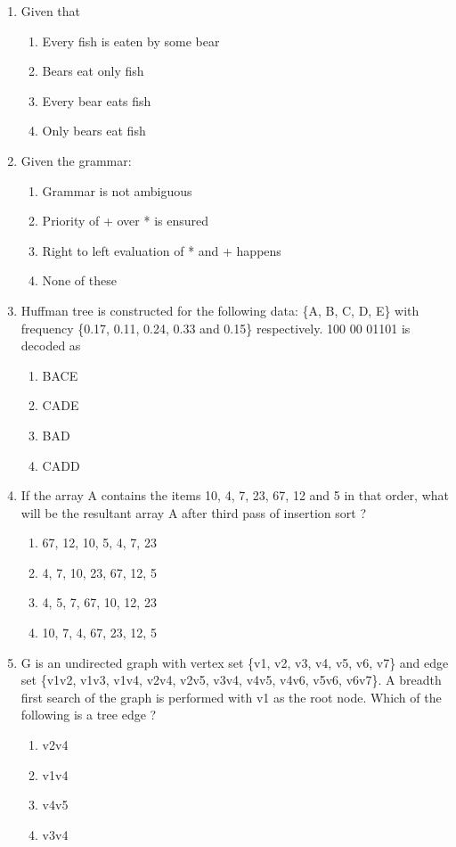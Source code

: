 \documentclass[12pt]{article}
\begin{document}
\begin{enumerate}
\item[41.] Given that
\begin{enumerate}[label=\Alph*.]
  \item Every fish is eaten by some bear
  \item Bears eat only fish
  \item Every bear eats fish
  \item Only bears eat fish
\end{enumerate}

\item[42.] Given the grammar:
\begin{enumerate}[label=\Alph*.]
  \item Grammar is not ambiguous
  \item Priority of + over * is ensured
  \item Right to left evaluation of * and + happens
  \item None of these
\end{enumerate}

\item[43.] Huffman tree is constructed for the following data: \{A, B, C, D, E\} with frequency \{0.17, 0.11, 0.24, 0.33 and 0.15\} respectively. 100 00 01101 is decoded as
\begin{enumerate}[label=\Alph*.]
  \item BACE
  \item CADE
  \item BAD
  \item CADD
\end{enumerate}

\item[44.] If the array A contains the items 10, 4, 7, 23, 67, 12 and 5 in that order, what will be the resultant array A after third pass of insertion sort ?
\begin{enumerate}[label=\Alph*.]
  \item 67, 12, 10, 5, 4, 7, 23
  \item 4, 7, 10, 23, 67, 12, 5
  \item 4, 5, 7, 67, 10, 12, 23
  \item 10, 7, 4, 67, 23, 12, 5
\end{enumerate}

\item[45.] G is an undirected graph with vertex set \{v1, v2, v3, v4, v5, v6, v7\} and edge set \{v1v2, v1v3, v1v4, v2v4, v2v5, v3v4, v4v5, v4v6, v5v6, v6v7\}. A breadth first search of the graph is performed with v1 as the root node. Which of the following is a tree edge ?
\begin{enumerate}[label=\Alph*.]
  \item v2v4
  \item v1v4
  \item v4v5
  \item v3v4
\end{enumerate}


\end{enumerate}
\end{document}
